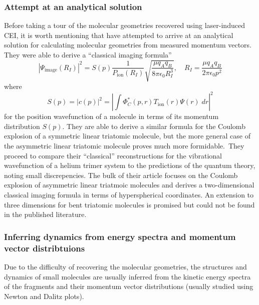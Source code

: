 \subsubsection*{Attempt at an analytical solution}
Before taking a tour of the molecular geometries recovered using laser-induced CEI, it is worth mentioning that \citet{Nagaya04} have attempted to arrive at an analytical solution for calculating molecular geometries from measured momentum vectors. They were able to derive a ``classical imaging formula''
\begin{equation}
|\Psi_\mathrm{image}(R_I)|^2 = S(p) \frac{1}{P_\mathrm{ion}(R_I)} \sqrt{\frac{\mu q_A q_B}{8\pi\epsilon_0 R_I^3}} , \quad R_I = \frac{\mu q_A q_B}{2\pi\epsilon_0 p^2}
\end{equation}
where
\begin{equation}
S(p) = |c(p)|^2 = \left| \int \Phi_C^*(p,r) T_\mathrm{ion}(r) \Psi(r) \; dr  \right|^2
\end{equation}
for the position wavefunction of a molecule in terms of its momentum distribution $S(p)$. They are able to derive a similar formula for the Coulomb explosion of a symmetric linear triatomic molecule, but the more general case of the asymmetric linear triatomic molecule proves much more formidable.\footnotemark ~They proceed to compare their ``classical'' reconstructions for the vibrational wavefunction of a helium trimer system to the predictions of the quantum theory, noting small discrepencies. The bulk of their article focuses on the Coulomb explosion of asymmetric linear triatmoic molecules and derives a two-dimensional classical imaging formula in terms of hyperspherical coordinates. An extension to three dimensions for bent triatomic molecules is promised but could not be found in the published literature.


\subsubsection*{Inferring dynamics from energy spectra and momentum vector distribtuions}
Due to the difficulty of recovering the molecular geometries, the structures and dynamics of small molecules are usually inferred from the kinetic energy spectra of the fragments and their momentum vector distributions (usually studied using Newton and Dalitz plots).

